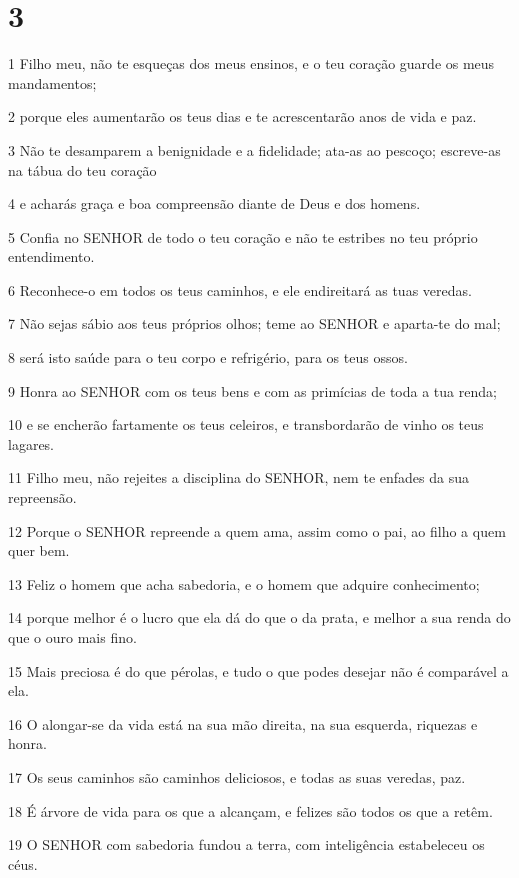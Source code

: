 \chapter{3}

\par 1 Filho meu, não te esqueças dos meus ensinos, e o teu coração guarde os meus mandamentos;
\par 2 porque eles aumentarão os teus dias e te acrescentarão anos de vida e paz.
\par 3 Não te desamparem a benignidade e a fidelidade; ata-as ao pescoço; escreve-as na tábua do teu coração
\par 4 e acharás graça e boa compreensão diante de Deus e dos homens.
\par 5 Confia no SENHOR de todo o teu coração e não te estribes no teu próprio entendimento.
\par 6 Reconhece-o em todos os teus caminhos, e ele endireitará as tuas veredas.
\par 7 Não sejas sábio aos teus próprios olhos; teme ao SENHOR e aparta-te do mal;
\par 8 será isto saúde para o teu corpo e refrigério, para os teus ossos.
\par 9 Honra ao SENHOR com os teus bens e com as primícias de toda a tua renda;
\par 10 e se encherão fartamente os teus celeiros, e transbordarão de vinho os teus lagares.
\par 11 Filho meu, não rejeites a disciplina do SENHOR, nem te enfades da sua repreensão.
\par 12 Porque o SENHOR repreende a quem ama, assim como o pai, ao filho a quem quer bem.
\par 13 Feliz o homem que acha sabedoria, e o homem que adquire conhecimento;
\par 14 porque melhor é o lucro que ela dá do que o da prata, e melhor a sua renda do que o ouro mais fino.
\par 15 Mais preciosa é do que pérolas, e tudo o que podes desejar não é comparável a ela.
\par 16 O alongar-se da vida está na sua mão direita, na sua esquerda, riquezas e honra.
\par 17 Os seus caminhos são caminhos deliciosos, e todas as suas veredas, paz.
\par 18 É árvore de vida para os que a alcançam, e felizes são todos os que a retêm.
\par 19 O SENHOR com sabedoria fundou a terra, com inteligência estabeleceu os céus.
